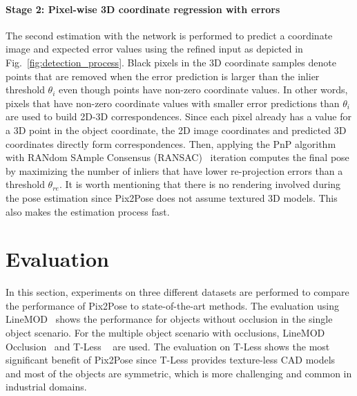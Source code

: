 \documentclass[10pt,twocolumn,letterpaper]{article}
\begin{document}
\paragraph{Stage 2: Pixel-wise 3D coordinate regression with errors}
The second estimation with the network is performed to predict a coordinate image and expected error values using the refined input as depicted in Fig.~\ref{fig:detection_process}. Black pixels in the 3D coordinate samples denote points that are removed when the error prediction is larger than the inlier threshold $\theta_{i}$ even though points have non-zero coordinate values. In other words, pixels that have non-zero coordinate values with smaller error predictions than $\theta_{i}$ are used to build 2D-3D correspondences. Since each pixel already has a value for a 3D point in the object coordinate, the 2D image coordinates and predicted 3D coordinates directly form correspondences. Then, applying the PnP algorithm~\cite{Lepetit2008epnp} with RANdom SAmple Consensus (RANSAC)~\cite{Ransac} iteration computes the final pose by maximizing the number of inliers that have lower re-projection errors than a threshold $\theta_{re}$. It is worth mentioning that there is no rendering involved during the pose estimation since Pix2Pose does not assume textured 3D models. This also makes the estimation process fast. 

\section{Evaluation} \label{evaluation}
In this section, experiments on three different datasets are performed to compare the performance of Pix2Pose to state-of-the-art methods. The evaluation using LineMOD~\cite{linemode_hinterstoisser2012} shows the performance for objects without occlusion in the single object scenario. For the multiple object scenario with occlusions, LineMOD Occlusion~\cite{brachmann2014learning_occlusion} and T-Less ~\cite{rgbddataset:tless} are used. The evaluation on T-Less shows the most significant benefit of Pix2Pose since T-Less provides texture-less CAD models and most of the objects are symmetric, which is more challenging and common in industrial domains.
\end{document}
